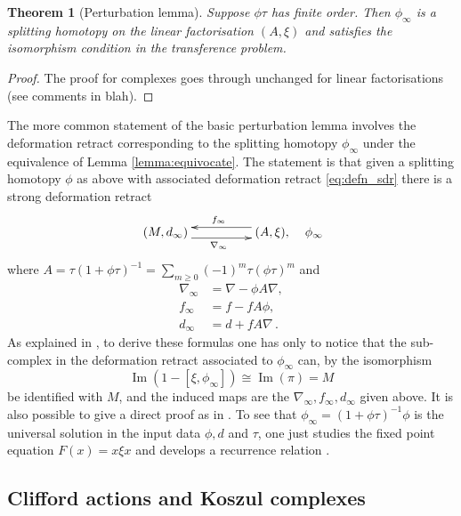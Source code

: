 \documentclass[english,letter paper,12pt,leqno]{article}
\newtheorem{theorem}{Theorem}[section]
\theoremstyle{example}
\numberwithin{equation}{section}
\def\im{\operatorname{Im}}
\begin{document}
\begin{theorem}[Perturbation lemma]\label{theorem:pertlemma} Suppose $\phi \tau$ has finite order. Then $\phi_\infty$ is a splitting homotopy on the linear factorisation $(A, \xi)$ and satisfies the isomorphism condition in the transference problem.
\end{theorem}
\begin{proof}
The proof for complexes \cite[p.886]{barneslambe} goes through unchanged for linear factorisations (see comments in blah).
\end{proof}

The more common statement of the basic perturbation lemma involves the deformation retract corresponding to the splitting homotopy $\phi_\infty$ under the equivalence of Lemma \ref{lemma:equivocate}. The statement is that given a splitting homotopy $\phi$ as above with associated deformation retract \eqref{eq:defn_sdr} there is a strong deformation retract
\begin{equation}\label{eq:perturbedsdr}
\xymatrix@C+2pc{
(M,d_\infty) \ar@<-1ex>[r]_{\nabla_\infty} & (A, \xi), \ar@<-1ex>[l]_{f_\infty}
} \quad \phi_\infty
\end{equation}
where $A = \tau( 1 + \phi \tau )^{-1} = \sum_{m \ge 0} (-1)^m \tau (\phi \tau)^m$ and
\begin{align*}
\nabla_\infty &= \nabla - \phi A \nabla,\\
f_\infty &= f - f A \phi,\\
d_\infty &= d + f A \nabla\,.
\end{align*}
As explained in \cite{barneslambe}, to derive these formulas one has only to notice that the sub-complex in the deformation retract associated to $\phi_\infty$ can, by the isomorphism
\[
\im(1 - [\xi, \phi_\infty]) \cong \im(\pi) = M
\]
be identified with $M$, and the induced maps are the $\nabla_\infty, f_\infty, d_\infty$ given above. It is also possible to give a direct proof as in \cite{crainic}. To see that $\phi_\infty = (1 + \phi \tau)^{-1} \phi$ is the universal solution in the input data $\phi, d$ and $\tau$, one just studies the fixed point equation $F(x) = x \xi x$ and develops a recurrence relation \cite[p.885]{barneslambe}.

\subsection{Clifford actions and Koszul complexes}\label{section:cliffordactkos}
\end{document}
